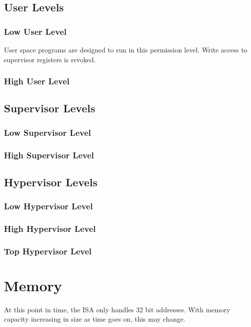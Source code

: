 \documentclass[letterpaper, 11pt]{article}
\begin{document}
\subsection{User Levels}
\subsubsection{Low User Level} User space programs are designed to run in this permission level. Write access to supervisor registers is revoked.
\subsubsection{High User Level}

\subsection{Supervisor Levels}
\subsubsection{Low Supervisor Level}
\subsubsection{High Supervisor Level}

\subsection{Hypervisor Levels}
\subsubsection{Low Hypervisor Level}
\subsubsection{High Hypervisor Level}
\subsubsection{Top Hypervisor Level}

\section{Memory}
\paragraph{}At this point in time, the ISA only handles 32 bit addresses.
With memory capacity increasing in size as time goes on, this may change. %
\end{document}
